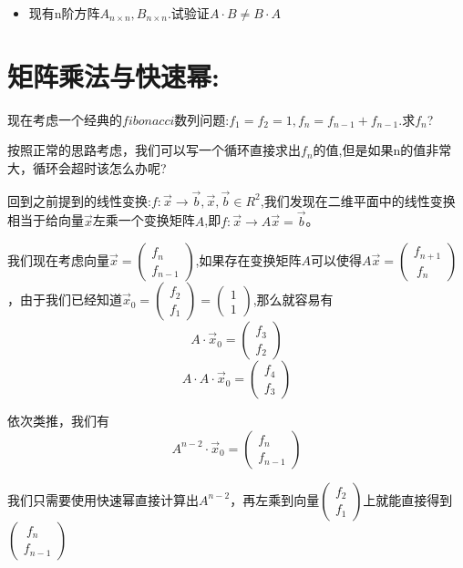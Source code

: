 \documentclass[UTF8]{article}
\begin{document}
\begin{itemize}
	\item 现有n阶方阵$A_{n\times n}, B_{n\times n}$.试验证$A\cdot B \neq B\cdot A$

\end{itemize}


\section{矩阵乘法与快速幂:}


现在考虑一个经典的$fibonacci$数列问题:$f_1 = f_2 = 1, f_n = f_{n-1} + f_{n-1}$.求$f_n$?

按照正常的思路考虑，我们可以写一个循环直接求出$f_n$的值,但是如果n的值非常大，循环会超时该怎么办呢?

回到之前提到的线性变换:$f:\vec{x}\rightarrow \vec{b}, \vec{x}, \vec{b}\in R^2$,我们发现在二维平面中的线性变换相当于给向量$\vec{x}$左乘一个变换矩阵$A$,即$f:\vec{x} \rightarrow A \vec{x} = \vec{b}$。

我们现在考虑向量$\vec{x} = \left(
\begin{array}{l}
f_n \\ 
f_{n-1}
\end{array}
\right)$,如果存在变换矩阵$A$可以使得$A\vec{x} = \left(
\begin{array}{l}
f_{n+1} \\ 
\ f_{n}
\end{array}
\right)$，由于我们已经知道$\vec{x}_0 = \left(
\begin{array}{l}
f_2 \\ 
f_1
\end{array}
\right) = \left(
\begin{array}{l}
1 \\ 
1
\end{array}
\right)$,那么就容易有
$$A\cdot\vec{x}_0 = \left(
\begin{array}{l}
f_3 \\ 
f_2
\end{array}
\right)
$$
$$A\cdot A\cdot \vec{x}_0 = \left(
\begin{array}{l}
f_4 \\ 
f_3
\end{array}
\right)
$$


依次类推，我们有$$A^{n-2} \cdot \vec{x}_0 = \left(
\begin{array}{l}
f_n \\ 
f_{n-1}
\end{array}
\right)$$

我们只需要使用快速幂直接计算出$A^{n-2}$，再左乘到向量$\left(
\begin{array}{l}
f_2 \\ 
f_1
\end{array}
\right)$上就能直接得到$\left(
\begin{array}{l}
\ f_n \\ 
f_{n-1}
\end{array}
\right)$
\end{document}
